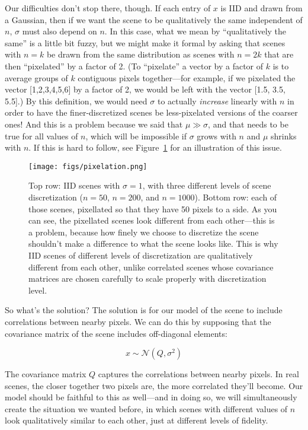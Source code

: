 Our difficulties don't stop there, though. If each entry of $x$ is IID and drawn from a Gaussian, then if we want the scene to be qualitatively the same independent of $n$, $\sigma$ must also depend on $n$. In this case, what we mean by ``qualitatively the same'' is a little bit fuzzy, but we might make it formal by asking that scenes with $n=k$ be drawn from the same distribution as scenes with $n=2k$ that are then ``pixelated'' by a factor of 2. (To ``pixelate'' a vector by a factor of $k$ is to average groups of $k$ contiguous pixels together---for example, if we pixelated the vector [1,2,3,4,5,6] by a factor of 2, we would be left with the vector [1.5, 3.5, 5.5].) By this definition, we would need $\sigma$ to actually \emph{increase} linearly with $n$ in order to have the finer-discretized scenes be less-pixelated versions of the coarser ones! And this is a problem because we said that $\mu \gg \sigma$, and that needs to be true for all values of $n$, which will be impossible if $\sigma$ grows with $n$ and $\mu$ shrinks with $n$. If this is hard to follow, see Figure~\ref{fig:pixelation} for an illustration of this issue.

\begin{figure}
\begin{center}
\texttt{[image: figs/pixelation.png]}
\caption{Top row: IID scenes with $\sigma=1$, with three different levels of scene discretization ($n=50$, $n=200$, and $n=1000$). Bottom row: each of those scenes, pixellated so that they have 50 pixels to a side. As you can see, the pixellated scenes look different from each other---this is a problem, because how finely we choose to discretize the scene shouldn't make a difference to what the scene looks like. This is why IID scenes of different levels of discretization are qualitatively different from each other, unlike correlated scenes whose covariance matrices are chosen carefully to scale properly with discretization level. \label{fig:pixelation}}
\end{center}
\end{figure}


So what's the solution? The solution is for our model of the scene to include correlations between nearby pixels. We can do this by supposing that the covariance matrix of the scene includes off-diagonal elements:

$$x \sim \mathcal{N}(Q, \sigma^2)$$

The covariance matrix $Q$ captures the correlations between nearby pixels. In real scenes, the closer together two pixels are, the more correlated they'll become. Our model should be faithful to this as well---and in doing so, we will simultaneously create the situation we wanted before, in which scenes with different values of $n$ look qualitatively similar to each other, just at different levels of fidelity. 

